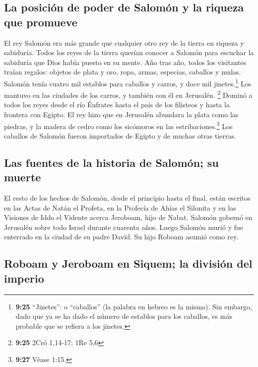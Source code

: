 \hypertarget{la-posiciuxf3n-de-poder-de-salomuxf3n-y-la-riqueza-que-promueve}{%
\subsection{La posición de poder de Salomón y la riqueza que
promueve}\label{la-posiciuxf3n-de-poder-de-salomuxf3n-y-la-riqueza-que-promueve}}

 El rey Salomón era más grande que cualquier otro rey de
la tierra en riqueza y sabiduría.  Todos los reyes de la
tierra querían conocer a Salomón para escuchar la sabiduría que Dios
había puesto en su mente.  Año tras año, todos los
visitantes traían regalos: objetos de plata y oro, ropa, armas,
especias, caballos y mulas.  Salomón tenía cuatro mil
establos para caballos y carros, y doce mil jinetes.\footnote{\textbf{9:25}
  ``Jinetes'': o ``caballos'' (la palabra en hebreo es la misma). Sin
  embargo, dado que ya se ha dado el número de establos para los
  caballos, es más probable que se refiera a los jinetes.} Los mantuvo
en las ciudades de los carros, y también con él en Jerusalén.
\footnote{\textbf{9:25} 2Cró 1,14-17; 1Re 5,6}  Dominó a
todos los reyes desde el río Éufrates hasta el país de los filisteos y
hasta la frontera con Egipto.  El rey hizo que en
Jerusalén abundara la plata como las piedras, y la madera de cedro como
los sicómoros en las estribaciones.\footnote{\textbf{9:27} Véase 1:15.}
 Los caballos de Salomón fueron importados de Egipto y de
muchas otras tierras.

\hypertarget{las-fuentes-de-la-historia-de-salomuxf3n-su-muerte}{%
\subsection{Las fuentes de la historia de Salomón; su
muerte}\label{las-fuentes-de-la-historia-de-salomuxf3n-su-muerte}}

 El resto de los hechos de Salomón, desde el principio
hasta el final, están escritos en las Actas de Natán el Profeta, en la
Profecía de Ahías el Silonita y en las Visiones de Iddo el Vidente
acerca Jeroboam, hijo de Nabat.  Salomón gobernó en
Jerusalén sobre todo Israel durante cuarenta años.  Luego
Salomón murió y fue enterrado en la ciudad de su padre David. Su hijo
Roboam asumió como rey.

\hypertarget{roboam-y-jeroboam-en-siquem-la-divisiuxf3n-del-imperio}{%
\subsection{Roboam y Jeroboam en Siquem; la división del
imperio}\label{roboam-y-jeroboam-en-siquem-la-divisiuxf3n-del-imperio}}

